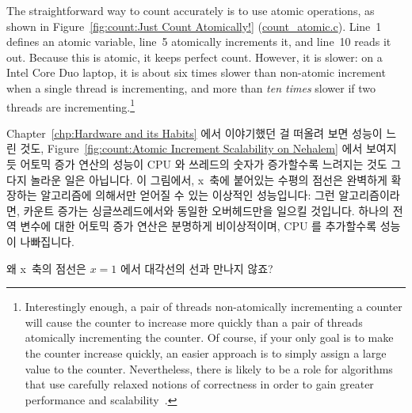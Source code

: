 The straightforward way to count accurately is to use atomic operations,
as shown in
Figure~\ref{fig:count:Just Count Atomically!} (\url{count_atomic.c}).
Line~1 defines an atomic variable, line~5 atomically increments it, and
line~10 reads it out.
Because this is atomic, it keeps perfect count.
However, it is slower: on a Intel Core Duo laptop, it is about
six times slower than non-atomic increment
when a single thread is incrementing, and more than \emph{ten times}
slower if two threads are incrementing.\footnote{
	Interestingly enough, a pair of threads non-atomically incrementing
	a counter will cause the counter to increase more quickly than
	a pair of threads atomically incrementing the counter.
	Of course, if your only goal is to make the counter increase
	quickly, an easier approach is to simply assign a large value
	to the counter.
	Nevertheless, there is likely to be a role for algorithms that
	use carefully relaxed notions of correctness in order to gain
	greater performance and
	scalability~\cite{Andrews91textbook,Arcangeli03,DavidUngar2011unsync}.}
\fi

Chapter~\ref{chp:Hardware and its Habits} 에서 이야기했던 걸 떠올려 보면
성능이 느린 것도,
Figure~\ref{fig:count:Atomic Increment Scalability on Nehalem} 에서 보여지듯
어토믹 증가 연산의 성능이 CPU 와 쓰레드의 숫자가 증가할수록 느려지는 것도
그다지 놀라운 일은 아닙니다.
이 그림에서, x~축에 붙어있는 수평의 점선은 완벽하게 확장하는 알고리즘에
의해서만 얻어질 수 있는 이상적인 성능입니다: 그런 알고리즘이라면, 카운트 증가는
싱글쓰레드에서와 동일한 오버헤드만을 일으킬 것입니다.
하나의 전역 변수에 대한 어토믹 증가 연산은 분명하게 비이상적이며, CPU 를
추가할수록 성능이 나빠집니다.

\QuickQuiz{}
	왜 x~축의 점선은 $x=1$ 에서 대각선의 선과 만나지 않죠?
	\iffalse

